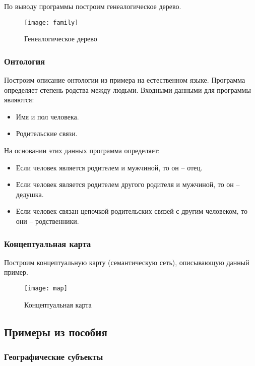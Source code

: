 По выводу программы построим генеалогическое дерево.

\begin{figure}[H]
	\centering
	\texttt{[image: family]}
	\caption{Генеалогическое дерево}
\end{figure}

\subsubsection{Онтология}

Построим описание онтологии из примера на естественном языке. Программа определяет степень родства между людьми. Входными данными для программы являются:

\begin{itemize}
	\item Имя и пол человека.
	\item Родительские связи.
\end{itemize}

На основании этих данных программа определяет:

\begin{itemize}
	\item Если человек является родителем и мужчиной, то он -- отец.
	\item Если человек является родителем другого родителя и мужчиной, то он -- дедушка.
	\item Если человек связан цепочкой родительских связей с другим человеком, то они -- родственники.
\end{itemize}

\subsubsection{Концептуальная карта}

Построим концептуальную карту (семантическую сеть), описывающую данный пример.

\begin{figure}[H]
	\centering
	\texttt{[image: map]}
	\caption{Концептуальная карта}
\end{figure}

\subsection{Примеры из пособия}

\subsubsection{Географические субъекты}

